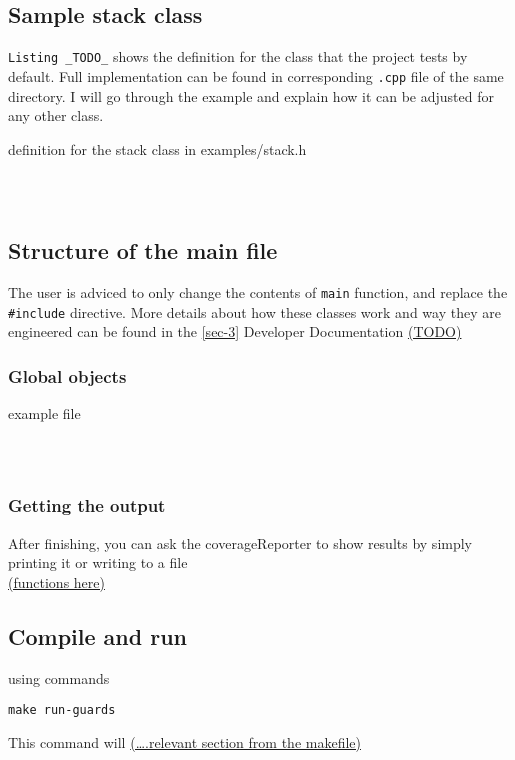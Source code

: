 \documentclass{elteikthesis}[2018/06/06]
\begin{document}
\subsection{Sample stack  class}
\label{sec-2-4-1}
\texttt{Listing \_TODO\_} shows the definition for the class that the project tests by default. Full implementation can be found in corresponding \lstinline{.cpp} file of the same directory. I will go through the example and explain how it can be adjusted for any other class. \\
\begin{listing}
\caption{definition for the stack class in examples/stack.h}
\inputminted[firstline=6,lastline=24]{c++}{examples/stack.h} \\
\end{listing}
\subsection{Structure of the main file}
\label{sec-2-4-2}
The user is adviced to only change the contents of \lstinline{main} function, and replace the \lstinline{#include} directive. More details about how these classes work and way they are engineered can be found in the \ref{sec-3} Developer Documentation \uline{(TODO)} \\

\subsubsection{Global objects}
\label{sec-2-4-2-1}
\begin{listing}
\caption{example file}
\inputminted[firstline=10,lastline=15]{c++}{src/main.cc} \\
\end{listing}

\subsubsection{Getting the output}
\label{sec-2-4-2-2}
After finishing, you can ask the coverageReporter to show results by simply printing it or writing to a file \\
\uline{(functions here)} \\
\subsection{Compile and run}
\label{sec-2-4-3}
using commands \\
\begin{verbatim}
make run-guards
\end{verbatim}
This command will \uline{(\ldots{}.relevant section from the makefile)} \\
\begin{center}
\begin{tabular}{}
\\
\\
\end{tabular}
\end{center}
\end{document}
